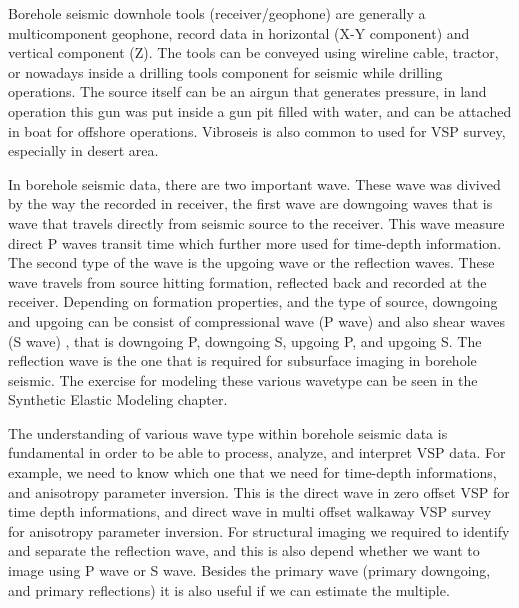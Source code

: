 \documentclass{article}
\begin{document}
\vspace{24pt}
Borehole seismic downhole tools (receiver/geophone) are generally a multicomponent 
geophone, record data in horizontal (X-Y component) and vertical component (Z). 
The tools can be conveyed using wireline cable, tractor, or nowadays inside a drilling 
tools component for seismic while drilling operations. The source itself can be 
an airgun that generates pressure, in land operation this gun was put inside a 
gun pit filled with water, and can be attached in boat for offshore operations. 
Vibroseis is also common to used for VSP survey, especially in desert area. 

\vspace{24pt}
In borehole seismic data, there are two important wave. These wave was divived 
by the way the recorded in receiver, the first wave are downgoing waves that is 
wave that travels directly from seismic source to the receiver. This wave measure 
direct P waves transit time which further more used for time-depth information. 
The second type of the wave is the upgoing wave or the reflection waves. These 
wave travels from source hitting formation, reflected back and recorded at the 
receiver. Depending on formation properties, and the type of source, downgoing 
and upgoing can be consist of compressional wave (P wave) and also shear waves 
(S wave) , that is downgoing P, downgoing S, upgoing P, and upgoing S. The reflection 
wave is the one that is required for subsurface imaging in borehole seismic. The 
exercise for modeling these various wavetype can be seen in the Synthetic Elastic 
Modeling chapter. 

\vspace{24pt}
The understanding of various wave type within borehole seismic data is fundamental 
in order to be able to process, analyze, and interpret VSP data. For example, we 
need to know which one that we need for time-depth informations, and anisotropy 
parameter inversion. This is the direct wave in zero offset VSP for time depth 
informations, and direct wave in multi offset walkaway VSP survey for anisotropy 
parameter inversion. For structural imaging we required to identify and separate 
the reflection wave, and this is also depend whether we want to image using P wave 
or S wave. Besides the primary wave (primary downgoing, and primary reflections) 
it is also useful if we can estimate the multiple. 
\end{document}
